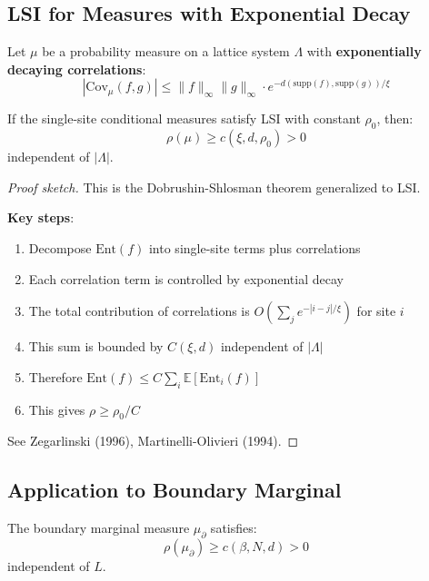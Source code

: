 \subsection{LSI for Measures with Exponential Decay}

\begin{theorem}
\label{thm:zegarlinski}
Let $\mu$ be a probability measure on a lattice system $\Lambda$ with 
\textbf{exponentially decaying correlations}:
\[
|\mathrm{Cov}_\mu(f, g)| \leq \|f\|_\infty \|g\|_\infty \cdot e^{-d(\mathrm{supp}(f), \mathrm{supp}(g))/\xi}
\]

If the single-site conditional measures satisfy LSI with constant $\rho_0$, then:
\[
\rho(\mu) \geq c(\xi, d, \rho_0) > 0
\]
independent of $|\Lambda|$.
\end{theorem}

\begin{proof}[Proof sketch]
This is the Dobrushin-Shlosman theorem generalized to LSI.

\textbf{Key steps}:
\begin{enumerate}
\item Decompose $\mathrm{Ent}(f)$ into single-site terms plus correlations
\item Each correlation term is controlled by exponential decay
\item The total contribution of correlations is $O(\sum_j e^{-|i-j|/\xi})$ for site $i$
\item This sum is bounded by $C(\xi, d)$ independent of $|\Lambda|$
\item Therefore $\mathrm{Ent}(f) \leq C \sum_i \mathbb{E}[\mathrm{Ent}_i(f)]$
\item This gives $\rho \geq \rho_0 / C$
\end{enumerate}

See Zegarlinski (1996), Martinelli-Olivieri (1994).
\end{proof}

\subsection{Application to Boundary Marginal}

\begin{theorem}
\label{thm:boundary-lsi}
The boundary marginal measure $\mu_\partial$ satisfies:
\[
\rho(\mu_\partial) \geq c(\beta, N, d) > 0
\]
independent of $L$.
\end{theorem}

